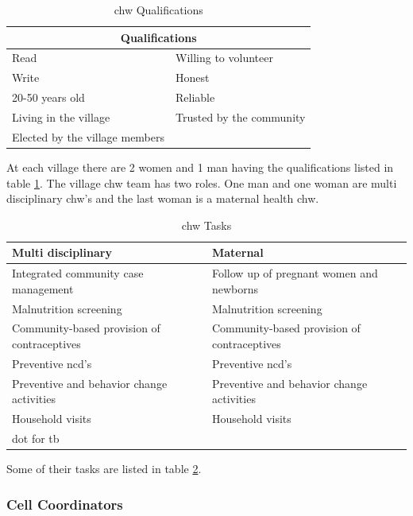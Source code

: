 \begin{table}
\centering
\begin{tabular}{|l l|}
\hline
\multicolumn{2}{|c|}{\textbf{Qualifications}} \\
\hline
Read & Willing to volunteer \\
Write & Honest \\
20-50 years old & Reliable \\
Living in the village & Trusted by the community \\
Elected by the village members & \\
\hline
\end{tabular}
\caption{\gls{chw} Qualifications}
\label{table:chdqualifications}
\end{table}

At each village there are 2 women and 1 man having the qualifications listed in table \ref{table:chdqualifications}. The village \gls{chw} team has two roles. One man and one woman are multi disciplinary \gls{chw}'s and the last woman is a maternal health \gls{chw}.


\begin{table}
\centering
\begin{tabular}{|p{5cm}|p{5cm}|}
\hline
\textbf{Multi disciplinary} & \textbf{Maternal} \\
\hline
Integrated community case management & Follow up of pregnant women and newborns \\
\hline
Malnutrition screening & Malnutrition screening \\
\hline
Community-based provision of contraceptives & Community-based provision of contraceptives \\
\hline
Preventive \gls{ncd}'s & Preventive \gls{ncd}'s \\
\hline
Preventive and behavior change activities & Preventive and behavior change activities \\
\hline
Household visits & Household visits \\
\hline
\gls{dot} for \gls{tb} & \\
\hline
\end{tabular}
\caption{\gls{chw} Tasks}
\label{table:chwtasks}
\end{table}

Some of their tasks are listed in table \ref{table:chwtasks}.

\cite{chd:strategy}

\subsubsection{Cell Coordinators}


